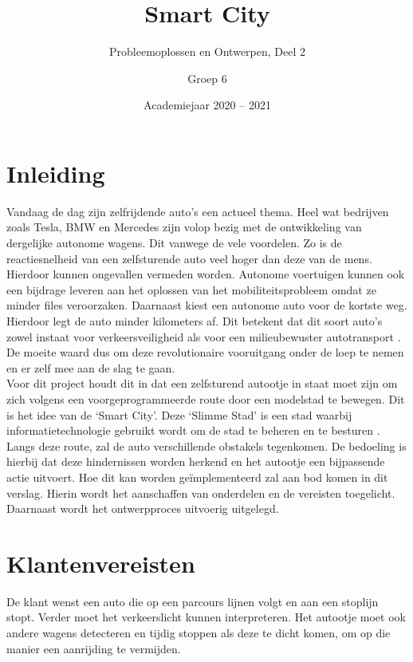 \documentclass[a4paper,twoside,kulak]{kulakreport} %
\title{Smart City}
\subtitle{Probleemoplossen en Ontwerpen, Deel 2}
\author{Groep 6}
\institute {Aaron Vandenberghe, Dieter Demuynck, Jolien Barbier\\  
	Mathis Bossuyt, Rani Jans en Sarah De Meester \\~\\ 
	o.l.v. Benjamin Maveau Kevin Truyaert en Martijn Boussé}
\date{Academiejaar 2020 -- 2021}
\begin{document}

\titlepage 
\tableofcontents
\renewcommand\thesection{\arabic{section}}
\renewcommand\thesubsection{\thesection.\arabic{subsection}}
\newpage
\section*{Inleiding}\label{Inleiding}
Vandaag de dag zijn zelfrijdende auto's een actueel thema. Heel wat bedrijven zoals Tesla, BMW en Mercedes zijn volop bezig met de ontwikkeling van dergelijke autonome wagens. Dit vanwege de vele voordelen. Zo is de reactiesnelheid van een zelfsturende auto veel hoger dan deze van de mens. Hierdoor kunnen ongevallen vermeden worden. Autonome voertuigen kunnen ook een bijdrage leveren aan het oplossen van het mobiliteitsprobleem omdat ze minder files veroorzaken. Daarnaast kiest een autonome auto voor de kortste weg. Hierdoor legt de auto minder kilometers af. Dit betekent dat dit soort auto's zowel instaat voor verkeersveiligheid als voor een milieubewuster autotransport \cite{AutonomeAutos1, AutonomeAutos2}. De moeite waard dus om deze revolutionaire vooruitgang onder de loep te nemen en er zelf mee aan de slag te gaan.\\
Voor dit project houdt dit in dat een zelfsturend autootje in staat moet zijn om zich volgens een voorgeprogrammeerde route door een modelstad te bewegen. Dit is het idee van de `Smart City'. Deze `Slimme Stad' is een stad waarbij informatietechnologie gebruikt wordt om de stad te beheren en te besturen \cite{SmartCity}. Langs deze route, zal de auto verschillende obstakels tegenkomen. De bedoeling is hierbij dat deze hindernissen worden herkend en het autootje een bijpassende actie uitvoert. Hoe dit kan worden geïmplementeerd zal aan bod komen in dit verslag. Hierin wordt het aanschaffen van onderdelen en de vereisten toegelicht. Daarnaast wordt het ontwerpproces uitvoerig uitgelegd. 


\section{Klantenvereisten} \label{Klantenvereisten}
De klant wenst een auto die op een parcours lijnen volgt en aan een stoplijn stopt. Verder moet het verkeerslicht kunnen interpreteren. Het autootje moet ook andere wagens detecteren en tijdig stoppen als deze te dicht komen, om op die manier een aanrijding te vermijden. 
\end{document}
